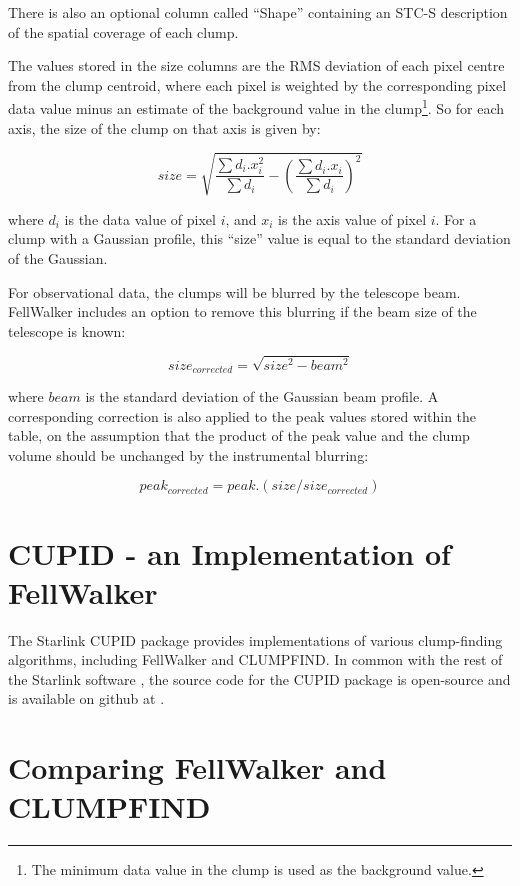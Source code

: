 \documentclass[final,authoryear,5p,times,twocolumn]{elsarticle}
\begin{document}
\begin{enumerate}
There is also an optional column called ``Shape'' containing an STC-S
description \citep{2010ASPC..434..213B,2007STCS} of the spatial coverage
of each clump.

The values stored in the size columns are the RMS deviation of each pixel
centre from the clump centroid, where each pixel is weighted by the
corresponding pixel data value minus an estimate of the background value
in the clump\footnote{The minimum data value in the clump is used as the
background value.}. So for each axis, the size of the clump on that axis
is given by:

\[ size = \sqrt{ \frac{ \sum d_{i}.x_{i}^{2} }{ \sum d_{i} } -
\left( \frac{\sum d_{i}.x_{i} }{\sum d_{i}}  \right)^2 } \]

where $d_{i}$ is the data value of pixel $i$, and $x_{i}$ is the axis
value of pixel $i$. For a clump with a Gaussian profile, this
``size'' value is equal to the standard deviation of the Gaussian.

For observational data, the clumps will be blurred by the telescope beam.
FellWalker includes an option to remove this blurring if the beam size of
the telescope is known:

\[ size_{corrected} = \sqrt{ size^{2} - beam^{2} } \]

where $beam$ is the standard deviation of the Gaussian beam profile. A
corresponding correction is also applied to the peak values stored within
the table, on the assumption that the product of the peak value and the
clump volume should be unchanged by the instrumental blurring:

\[ peak_{corrected} = peak.(size/size_{corrected}) \]

\end{enumerate}



\section{\label{sec:cupid}CUPID - an Implementation of FellWalker}
The Starlink CUPID package \citep[][]{CupidAdass,SUN255} provides
implementations of various clump-finding algorithms, including FellWalker
and CLUMPFIND. In common with the rest of the Starlink software \citep[][]{StarlinkAdass},
the source code for the CUPID package is open-source and is available on github at
.

\section{Comparing FellWalker and CLUMPFIND}
\end{document}
